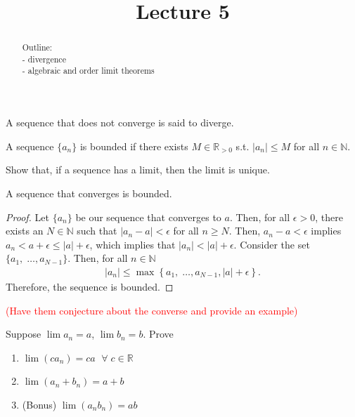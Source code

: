 \documentclass{ximera}
\begin{document}
    \title{Lecture 5}
    
    \begin{abstract}  
    Outline: \\
    - divergence \\
    - algebraic and order limit theorems
\end{abstract}

\maketitle

\begin{definition}
    A sequence that does not converge is said to diverge.
\end{definition}

\begin{definition}
    A sequence $\{a_n\}$ is bounded if there exists $ M \in \mathbb{R}_{>0}$ s.t. $|a_n| \leq M$ for all $n \in \mathbb{N}$.
\end{definition}

\begin{exercise}
    Show that, if a sequence has a limit, then the limit is unique.
\end{exercise}

\begin{theorem}
    A sequence that converges is bounded.
\end{theorem}
\begin{proof}
    Let $\{a_n\}$ be our sequence that converges to $a$.  Then, for all $\epsilon > 0$, there exists an $N \in \mathbb{N}$ such that $|a_n -a| < \epsilon$ for all $n \geq N$. Then, $a_n -a < \epsilon$ implies $a_n < a + \epsilon \leq |a| + \epsilon $, which implies that $|a_n| < |a|+ \epsilon$. Consider the set $\{a_1, \;\ldots, a_{N-1}\}$.  Then, for all $n \in \mathbb{N}$
    \begin{align*}
        |a_n| \leq \max \left\{a_1, \;\ldots, a_{N-1}, |a| +\epsilon \right\}.
    \end{align*}
    Therefore, the sequence is bounded.
\end{proof}

\textcolor{red}{(Have them conjecture about the converse and provide an example)}

\begin{exercise}
    Suppose $\lim a_n = a$, $\lim b_n = b$.
    Prove 
    \begin{enumerate}
        \item $\lim(ca_n) = ca$ $\; \forall \;c \in \mathbb{R}$
        \item $\lim (a_n + b_n) = a+b$
        \item (Bonus) $\lim(a_nb_n) = ab$
    \end{enumerate}
\end{exercise}
\end{document}
